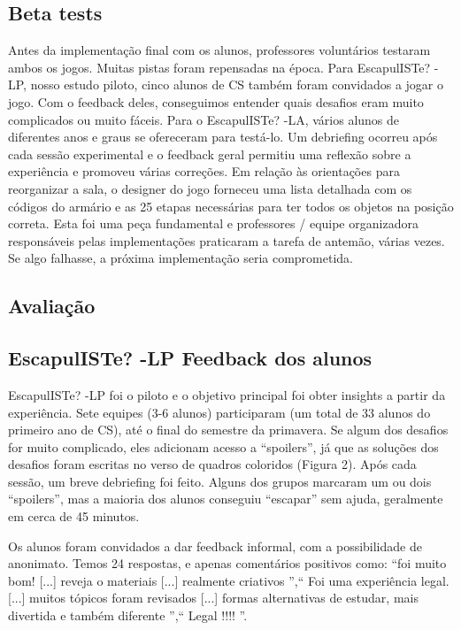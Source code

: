 \subsection{Beta tests}

Antes da implementação final com os alunos, professores voluntários testaram ambos os jogos. Muitas pistas foram repensadas na época. Para EscapulISTe? -LP, nosso estudo piloto, cinco alunos de CS também foram convidados a jogar o jogo. Com o feedback deles, conseguimos entender quais desafios eram muito complicados ou muito fáceis. Para o EscapulISTe? -LA, vários alunos de diferentes anos e graus se ofereceram para testá-lo. Um debriefing ocorreu após cada sessão experimental e o feedback geral permitiu uma reflexão sobre a experiência e promoveu várias correções. Em relação às orientações para reorganizar a sala, o designer do jogo forneceu uma lista detalhada com os códigos do armário e as 25 etapas necessárias para ter todos os objetos na posição correta. Esta foi uma peça fundamental e professores / equipe organizadora responsáveis pelas implementações praticaram a tarefa de antemão, várias vezes. Se algo falhasse, a próxima implementação seria comprometida.

\subsection{Avaliação}

\subsection{EscapulISTe? -LP Feedback dos alunos}

EscapulISTe? -LP foi o piloto e o objetivo principal foi obter insights a partir da experiência. Sete equipes (3-6 alunos) participaram (um total de 33 alunos do primeiro ano de CS), até o final do semestre da primavera. Se algum dos desafios for muito complicado, eles adicionam acesso a “spoilers”, já que as soluções dos desafios foram escritas no verso de quadros coloridos (Figura 2). Após cada sessão, um breve debriefing foi feito. Alguns dos grupos marcaram um ou dois “spoilers”, mas a maioria dos alunos conseguiu “escapar” sem ajuda, geralmente em cerca de 45 minutos.

Os alunos foram convidados a dar feedback informal, com a possibilidade de anonimato. Temos 24 respostas, e apenas comentários positivos como: “foi muito bom! [...] reveja o materiais [...] realmente criativos ”,“ Foi uma experiência legal. [...]
muitos tópicos foram revisados [...] formas alternativas de estudar,
mais divertida e também diferente ”,“ Legal !!!! ”.

